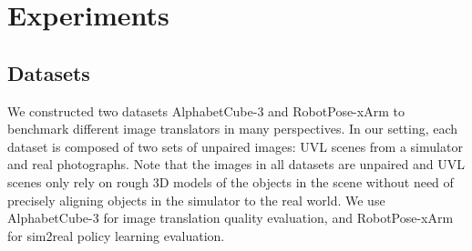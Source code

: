 \documentclass{article}
\begin{document}


\vspace{-8pt}
\section{Experiments}\label{sec:results}
\vspace{-3pt}
\subsection{Datasets}
\label{sec:datasetsresults}
\vspace{-2pt}
We constructed two datasets AlphabetCube-3 and RobotPose-xArm to benchmark different image translators in many perspectives.
In our setting, each dataset is composed of two sets of unpaired images: UVL scenes from a simulator and real photographs.
Note that the images in all datasets are unpaired and UVL scenes only rely on rough 3D models of the objects in the scene without need of precisely aligning objects in the simulator to the real world.
We use AlphabetCube-3 for image translation quality evaluation, and RobotPose-xArm for sim2real policy learning evaluation.



\end{document}
